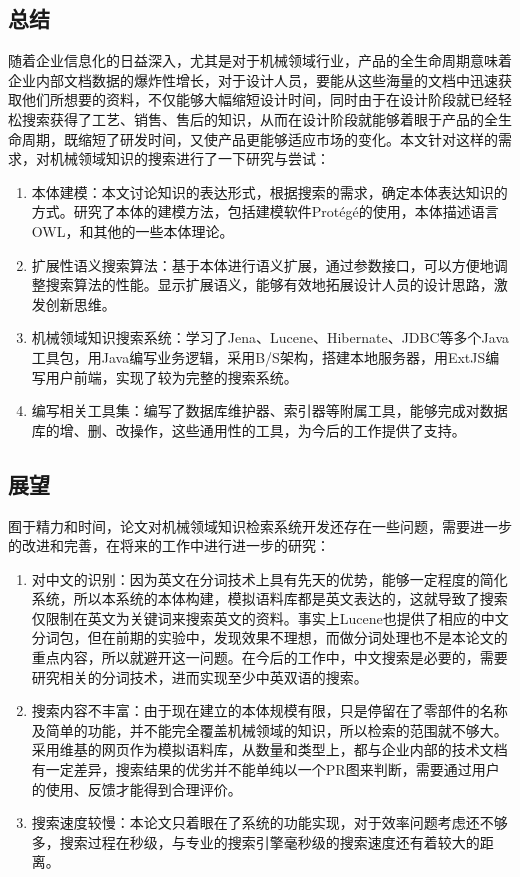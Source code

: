 \documentclass[12pt,a4paper]{article}
\begin{document}
\setcounter{figure}{0}
\setcounter{table}{0}
\setcounter{equation}{0}
	\subsection{总结}
	随着企业信息化的日益深入，尤其是对于机械领域行业，产品的全生命周期意味着企业内部文档数据的爆炸性增长，对于设计人员，要能从这些海量的文档中迅速获取他们所想要的资料，不仅能够大幅缩短设计时间，同时由于在设计阶段就已经轻松搜索获得了工艺、销售、售后的知识，从而在设计阶段就能够着眼于产品的全生命周期，既缩短了研发时间，又使产品更能够适应市场的变化。本文针对这样的需求，对机械领域知识的搜索进行了一下研究与尝试：
\begin{enumerate}
	\item 本体建模：本文讨论知识的表达形式，根据搜索的需求，确定本体表达知识的方式。研究了本体的建模方法，包括建模软件Prot{\'e}g{\'e}的使用，本体描述语言OWL，和其他的一些本体理论。
	\item 扩展性语义搜索算法：基于本体进行语义扩展，通过参数接口，可以方便地调整搜索算法的性能。显示扩展语义，能够有效地拓展设计人员的设计思路，激发创新思维。
	\item 机械领域知识搜索系统：学习了Jena、Lucene、Hibernate、JDBC等多个Java工具包，用Java编写业务逻辑，采用B/S架构，搭建本地服务器，用ExtJS编写用户前端，实现了较为完整的搜索系统。
	\item 编写相关工具集：编写了数据库维护器、索引器等附属工具，能够完成对数据库的增、删、改操作，这些通用性的工具，为今后的工作提供了支持。
\end{enumerate}
	\subsection{展望}
	囿于精力和时间，论文对机械领域知识检索系统开发还存在一些问题，需要进一步的改进和完善，在将来的工作中进行进一步的研究：
\begin{enumerate}
	\item 对中文的识别：因为英文在分词技术上具有先天的优势，能够一定程度的简化系统，所以本系统的本体构建，模拟语料库都是英文表达的，这就导致了搜索仅限制在英文为关键词来搜索英文的资料。事实上Lucene也提供了相应的中文分词包，但在前期的实验中，发现效果不理想，而做分词处理也不是本论文的重点内容，所以就避开这一问题。在今后的工作中，中文搜索是必要的，需要研究相关的分词技术，进而实现至少中英双语的搜索。
	\item 搜索内容不丰富：由于现在建立的本体规模有限，只是停留在了零部件的名称及简单的功能，并不能完全覆盖机械领域的知识，所以检索的范围就不够大。采用维基的网页作为模拟语料库，从数量和类型上，都与企业内部的技术文档有一定差异，搜索结果的优劣并不能单纯以一个PR图来判断，需要通过用户的使用、反馈才能得到合理评价。
	\item 搜索速度较慢：本论文只着眼在了系统的功能实现，对于效率问题考虑还不够多，搜索过程在秒级，与专业的搜索引擎毫秒级的搜索速度还有着较大的距离。
\end{enumerate}
\newpage	
\renewcommand\listfigurename{图片索引}
\renewcommand\listtablename{表格索引}
\listoffigures
\end{document}
